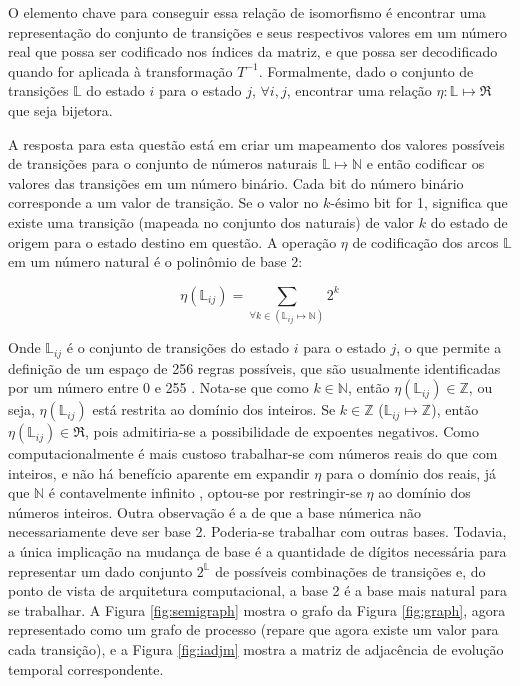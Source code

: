\documentclass[12pt,a4paper]{article}
\begin{document}
O elemento chave para conseguir essa relação de isomorfismo
é encontrar uma representação do conjunto de transições e
seus respectivos valores em um número real que possa ser codificado
nos índices da matriz, e que possa ser decodificado quando for
aplicada à transformação $T^{-1}$. Formalmente, dado o conjunto de transições
$\mathbb{L}$ do estado $i$ para o estado $j$, $\forall i,j$, encontrar uma
relação $\eta:\mathbb{L} \mapsto \Re$ que seja bijetora.

A resposta para esta questão está em criar um mapeamento dos valores
possíveis de transições para o conjunto de números naturais
$\mathbb{L} \mapsto \mathbb{N}$ e então codificar os valores das transições
em um número binário. Cada bit do número binário corresponde a um valor de
transição. Se o valor no $k$-ésimo bit for 1, significa que existe uma
transição (mapeada no conjunto dos naturais) de valor $k$ do estado de
origem para o estado destino em questão. A operação $\eta$ de codificação dos
arcos $\mathbb{L}$ em um número natural é o polinômio de base 2:

\begin{equation}
\eta(\mathbb{L}_{ij}) = \sum_{\forall k \in (\mathbb{L}_{ij} \mapsto \mathbb{N})} 2^k
\end{equation}

Onde $\mathbb{L}_{ij}$ é o conjunto de transições do estado $i$ para o estado
$j$, o que permite a definição de um espaço de 256 regras possíveis, que são usualmente
identificadas por um número entre 0 e 255 .
Nota-se que como $k \in \mathbb{N}$, então $\eta(\mathbb{L}_{ij}) \in \mathbb{Z}$,
ou seja, $\eta(\mathbb{L}_{ij})$ está restrita ao domínio dos inteiros. Se
$k \in \mathbb{Z}$ ($\mathbb{L}_{ij} \mapsto \mathbb{Z}$), então
$\eta(\mathbb{L}_{ij}) \in \Re$, pois admitiria-se a possibilidade de expoentes negativos.
Como computacionalmente é mais custoso trabalhar-se com números reais do que com inteiros,
e não há benefício aparente em expandir $\eta$ para o domínio dos reais,
já que $\mathbb{N}$ é contavelmente infinito , optou-se
por restringir-se $\eta$ ao domínio dos números inteiros. Outra observação
é a de que a base númerica não necessariamente deve ser base 2. Poderia-se trabalhar com outras
bases. Todavia, a única implicação na mudança de base é a quantidade de dígitos
necessária para representar um dado conjunto $2^{\mathbb{L}}$ de possíveis combinações de
transições e, do ponto de vista de arquitetura computacional, a base 2 é a
base mais natural para se trabalhar. A Figura \ref{fig:semigraph}
mostra o grafo da Figura \ref{fig:graph}, agora representado como um grafo de processo
(repare que agora existe um valor para cada transição), e a Figura \ref{fig:iadjm}
mostra a matriz de adjacência de evolução temporal correspondente.
\end{document}
